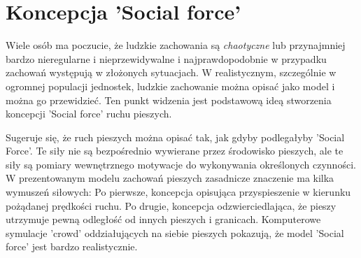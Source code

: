 \chapter{Koncepcja 'Social force'}
\hspace{4ex}Wiele osób ma poczucie, że ludzkie zachowania są {\it chaotyczne} lub przynajmniej bardzo nieregularne i nieprzewidywalne i najprawdopodobnie w przypadku zachowań występują w złożonych sytuacjach. W realistycznym, szczególnie w ogromnej populacji jednostek, ludzkie zachowanie można opisać jako model i można go przewidzieć. Ten punkt widzenia jest podstawową ideą stworzenia koncepcji 'Social force' ruchu pieszych.
\par \medskip
Sugeruje się, że ruch pieszych można opisać tak, jak gdyby podlegałyby 'Social Force'. Te siły nie są bezpośrednio wywierane przez środowisko pieszych, ale te siły są pomiary wewnętrznego motywacje do wykonywania określonych czynności. W prezentowanym modelu zachowań pieszych zasadnicze znaczenie ma kilka wymuszeń siłowych: Po pierwsze, koncepcja opisująca przyspieszenie w kierunku pożądanej prędkości ruchu. Po drugie, koncepcja odzwierciedlająca, że pieszy utrzymuje pewną odległość od innych pieszych i granicach. Komputerowe symulacje 'crowd' oddziałujących na siebie pieszych pokazują, że model 'Social force' jest bardzo realistycznie.

